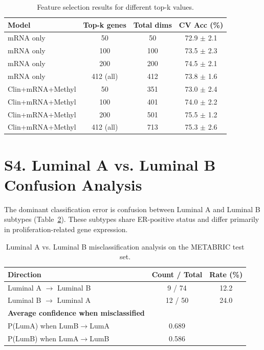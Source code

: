 \documentclass[11pt,a4paper]{article}
\begin{document}
\begin{table}[H]
\centering
\caption{Feature selection results for different top-k values.}
\label{supp:tab:feature_selection}
\begin{tabular}{lccc}
\toprule
\textbf{Model} & \textbf{Top-k genes} & \textbf{Total dims} & \textbf{CV Acc (\%)} \\
\midrule
mRNA only & 50 & 50 & 72.9 $\pm$ 2.1 \\
mRNA only & 100 & 100 & 73.5 $\pm$ 2.3 \\
mRNA only & 200 & 200 & 74.5 $\pm$ 2.1 \\
mRNA only & 412 (all) & 412 & 73.8 $\pm$ 1.6 \\
\midrule
Clin+mRNA+Methyl & 50 & 351 & 73.0 $\pm$ 2.4 \\
Clin+mRNA+Methyl & 100 & 401 & 74.0 $\pm$ 2.2 \\
Clin+mRNA+Methyl & 200 & 501 & 75.5 $\pm$ 1.2 \\
Clin+mRNA+Methyl & 412 (all) & 713 & 75.3 $\pm$ 2.6 \\
\bottomrule
\end{tabular}
\end{table}

\section*{S4. Luminal A vs. Luminal B Confusion Analysis}
\label{supp:luma_lumb}

The dominant classification error is confusion between Luminal A and Luminal B subtypes (Table~\ref{supp:tab:luma_lumb}). These subtypes share ER-positive status and differ primarily in proliferation-related gene expression.

\begin{table}[H]
\centering
\caption{Luminal A vs. Luminal B misclassification analysis on the METABRIC test set.}
\label{supp:tab:luma_lumb}
\begin{tabular}{lcc}
\toprule
\textbf{Direction} & \textbf{Count / Total} & \textbf{Rate (\%)} \\
\midrule
Luminal A $\rightarrow$ Luminal B & 9 / 74 & 12.2 \\
Luminal B $\rightarrow$ Luminal A & 12 / 50 & 24.0 \\
\midrule
\textbf{Average confidence when misclassified} & & \\
P(LumA) when LumB$\rightarrow$LumA & 0.689 & \\
P(LumB) when LumA$\rightarrow$LumB & 0.586 & \\
\bottomrule
\end{tabular}
\end{table}
\end{document}
